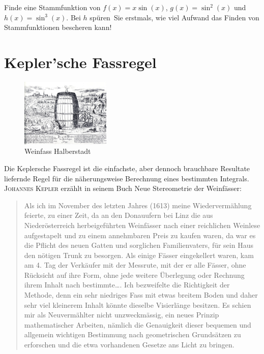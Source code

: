 \documentclass[%
11pt,%
twoside,%
titlepage,%
german,%
headsepline%
]{scrartcl}
\begin{document}
\begin{ueb}
Finde eine Stammfunktion von $f(x)=x\sin(x)$, $g(x)=\sin^2(x)$ und $h(x)=\sin^3(x)$. Bei $h$ \glqq spüren\grqq\ Sie erstmals, wie viel Aufwand das Finden von Stammfunktionen bescheren kann!
\end{ueb}

\pagebreak

\section{Kepler'sche Fassregel}

\begin{figure}
\vspace{-5pt}
  \begin{center}
    \includegraphics[width=0.38\textwidth]{pictures/weinfass}
  \end{center}
\caption{Weinfass Halberstadt}
\vspace{-10pt}
\end{figure}
Die Keplersche Fassregel ist die einfachste, aber dennoch brauchbare Resultate liefernde Regel für die näherungsweise Berechnung eines bestimmten Integrals.
\textsc{Johannes Kepler} erzählt in seinem Buch \glqq Neue Stereometrie der Weinfässer\grqq:
\begin{quote}
Als ich im November des letzten Jahres (1613) meine Wiedervermählung feierte, zu einer Zeit, da an den Donauufern bei Linz die aus Niederösterreich herbeigeführten Weinfässer nach einer reichlichen Weinlese aufgestapelt und zu einem annehmbaren Preis zu kaufen waren, da war es die Pflicht des neuen Gatten und sorglichen Familienvaters, für sein Haus den nötigen Trunk zu besorgen. Als einige Fässer eingekellert waren, kam am 4. Tag der Verkäufer mit der Messrute, mit der er alle Fässer, ohne Rücksicht auf ihre Form, ohne jede weitere Überlegung oder Rechnung ihrem Inhalt nach bestimmte\dots. Ich bezweifelte die Richtigkeit der Methode, denn ein sehr niedriges Fass mit etwas breitem Boden und daher sehr viel kleinerem Inhalt könnte dieselbe Visierlänge besitzen. Es schien mir als Neuvermählter nicht unzweckmässig, ein neues Prinzip mathematischer Arbeiten, nämlich die Genauigkeit dieser bequemen und allgemein wichtigen Bestimmung nach geometrischen Grundsätzen zu erforschen und die etwa vorhandenen Gesetze ans Licht zu bringen.\grqq
\end{quote}
\end{document}
